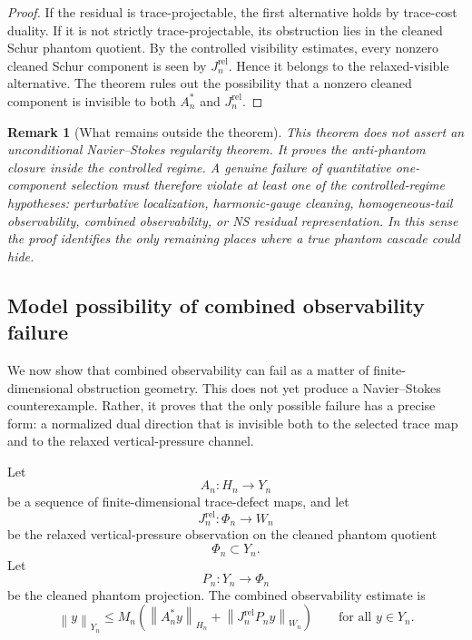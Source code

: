 \documentclass[11pt]{article}
\numberwithin{equation}{section}
\newtheorem{remark}[theorem]{Remark}
\newcommand{\norm}[2]{\left\|#1\right\|_{#2}}
\begin{document}
\begin{proof}
If the residual is trace-projectable, the first alternative holds by trace-cost duality. If it is not strictly trace-projectable, its obstruction lies in the cleaned Schur phantom quotient. By the controlled visibility estimates, every nonzero cleaned Schur component is seen by \(J_n^{\mathrm{rel}}\). Hence it belongs to the relaxed-visible alternative. The theorem rules out the possibility that a nonzero cleaned component is invisible to both \(A_n^*\) and \(J_n^{\mathrm{rel}}\).
\end{proof}

\begin{remark}[What remains outside the theorem]
This theorem does not assert an unconditional Navier--Stokes regularity theorem. It proves the anti-phantom closure inside the controlled regime. A genuine failure of quantitative one-component selection must therefore violate at least one of the controlled-regime hypotheses: perturbative localization, harmonic-gauge cleaning, homogeneous-tail observability, combined observability, or NS residual representation. In this sense the proof identifies the only remaining places where a true phantom cascade could hide.
\end{remark}

\subsection{Model possibility of combined observability failure}\label{subsec:model-combined-observability-failure}

We now show that combined observability can fail as a matter of finite-dimensional obstruction geometry. This does not yet produce a Navier--Stokes counterexample. Rather, it proves that the only possible failure has a precise form: a normalized dual direction that is invisible both to the selected trace map and to the relaxed vertical-pressure channel.

Let
\[
A_n:H_n\to Y_n
\]
be a sequence of finite-dimensional trace-defect maps, and let
\[
J_n^{\mathrm{rel}}:\Phi_n\to W_n
\]
be the relaxed vertical-pressure observation on the cleaned phantom quotient
\[
\Phi_n\subset Y_n.
\]
Let
\[
P_n:Y_n\to \Phi_n
\]
be the cleaned phantom projection. The combined observability estimate is
\begin{equation}\label{eq:combined-observability-model}
\norm{y}{Y_n}
\le
M_n\left(
\norm{A_n^*y}{H_n}
+
\norm{J_n^{\mathrm{rel}}P_ny}{W_n}
\right)
\qquad
\text{for all }y\in Y_n.
\end{equation}
\end{document}
